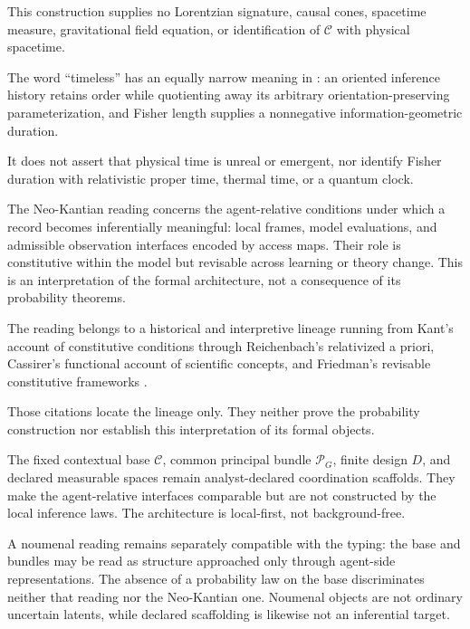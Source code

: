 This construction supplies no Lorentzian
signature, causal cones, spacetime measure, gravitational field equation, or
identification of $\mathcal C$ with physical spacetime.

The word ``timeless'' has an equally narrow meaning in
: an oriented inference history retains order
while quotienting away its arbitrary orientation-preserving parameterization,
and Fisher length supplies a nonnegative information-geometric duration.

It
does not assert that physical time is unreal or emergent, nor identify Fisher
duration with relativistic proper time, thermal time, or a quantum clock.

The Neo-Kantian reading concerns the agent-relative conditions under which a
record becomes inferentially meaningful: local frames, model evaluations, and
admissible observation interfaces encoded by access maps.  Their role is
constitutive within the model but revisable across learning or theory change.
This is an interpretation of the formal architecture, not a consequence of
its probability theorems.

The reading belongs to a historical and interpretive lineage running from
Kant's account of constitutive conditions through Reichenbach's relativized
a priori, Cassirer's functional account of scientific concepts, and Friedman's
revisable constitutive frameworks
\citep{Kant1781,Reichenbach1965,Cassirer1923,Friedman2001}.

Those citations locate the lineage only.  They neither prove the probability
construction nor establish this interpretation of its formal objects.

The fixed contextual base \(\mathcal C\), common principal bundle
\(\mathscr P_G\), finite design \(D\), and declared measurable spaces remain
analyst-declared coordination scaffolds.  They make the agent-relative
interfaces comparable but are not constructed by the local inference laws.
The architecture is local-first, not background-free. 

A noumenal reading remains separately compatible with the typing: the base
and bundles may be read as structure approached only through agent-side
representations.  The absence of a probability law on the base discriminates
neither that reading nor the Neo-Kantian one.  Noumenal objects are not
ordinary uncertain latents, while declared scaffolding is likewise not an
inferential target. 

